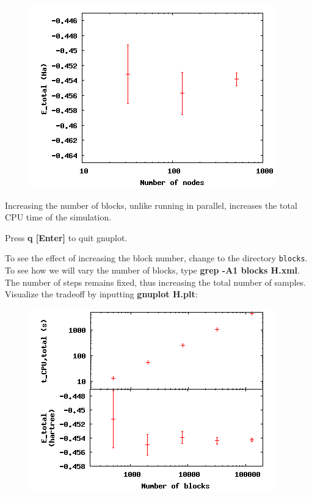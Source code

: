 \FloatBarrier
\begin{figure}[ht!]
\begin{center}
\includegraphics[trim = 0mm 0mm 0mm 0mm, clip,width=0.75\columnwidth]{./figures/lab_qmc_statistics_nodes}
\end{center}
\end{figure}
\FloatBarrier


Increasing the number of blocks, unlike running in parallel, increases the
total CPU time of the simulation.  

Press \textbf{q [Enter]} to quit gnuplot.

To see the effect of increasing the block number, change to the directory
\texttt{blocks}. To see how we will vary the number of blocks, type
\textbf{grep -A1 blocks H.xml}.  The number of steps remains fixed, thus
increasing the total number of samples.   Visualize the tradeoff by inputting
\textbf{gnuplot H.plt}: 

\FloatBarrier
\begin{figure}[ht!]
\begin{center}
\includegraphics[trim = 0mm 0mm 0mm 0mm, clip,width=0.75\columnwidth]{./figures/lab_qmc_statistics_blocks}
\end{center}
\end{figure}
\FloatBarrier

